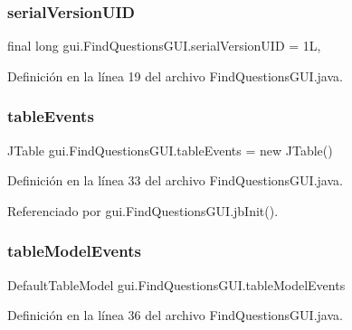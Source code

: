\subsubsection{\texorpdfstring{serialVersionUID}{serialVersionUID}}
{\footnotesize\ttfamily final long gui.\+Find\+Questions\+G\+U\+I.\+serial\+Version\+U\+ID = 1L\hspace{0.3cm}{\ttfamily [static]}, {\ttfamily [private]}}



Definición en la línea 19 del archivo Find\+Questions\+G\+U\+I.\+java.

\mbox{\label{classgui_1_1FindQuestionsGUI_a022fc8764d950afede789bb83ce7b5aa}} 
\subsubsection{\texorpdfstring{tableEvents}{tableEvents}}
{\footnotesize\ttfamily J\+Table gui.\+Find\+Questions\+G\+U\+I.\+table\+Events = new J\+Table()\hspace{0.3cm}{\ttfamily [private]}}



Definición en la línea 33 del archivo Find\+Questions\+G\+U\+I.\+java.



Referenciado por gui.\+Find\+Questions\+G\+U\+I.\+jb\+Init().

\mbox{\label{classgui_1_1FindQuestionsGUI_a142cc8ef4c568a9fa22bbd21393dcd66}} 
\subsubsection{\texorpdfstring{tableModelEvents}{tableModelEvents}}
{\footnotesize\ttfamily Default\+Table\+Model gui.\+Find\+Questions\+G\+U\+I.\+table\+Model\+Events\hspace{0.3cm}{\ttfamily [private]}}



Definición en la línea 36 del archivo Find\+Questions\+G\+U\+I.\+java.



